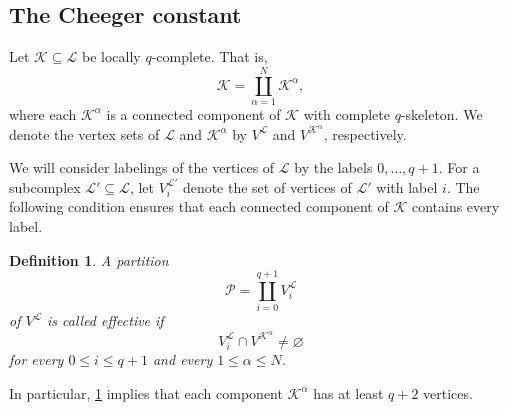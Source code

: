 \documentclass{article}
\newtheorem{definition}{Definition}[section]
\newcommand{\KK}{\mathcal{K}}
\newcommand{\LL}{\mathcal{L}}
\begin{document}
\subsection{The Cheeger constant}

Let $\KK \subseteq \LL$ be locally $q$-complete. That is,
\[
\KK = \coprod_{\alpha=1}^N \KK^\alpha,
\]
where each $\KK^\alpha$ is a connected component of $\KK$ with complete
$q$-skeleton. We denote the vertex sets of $\LL$ and $\KK^\alpha$ by
$V^\LL$ and $V^{\KK^\alpha}$, respectively.

We will consider labelings of the vertices of $\LL$ by the labels
$0,\ldots,q+1$. For a subcomplex $\LL'\subseteq \LL$, let
$V_i^{\LL'}$ denote the set of vertices of $\LL'$ with label $i$. The following condition ensures that each connected component of $\KK$
contains every label.

\begin{definition}\label{def:effective}
A partition
\[
\mathcal{P} = \coprod_{i=0}^{q+1} V_i^\LL
\]
of $V^\LL$ is called \emph{effective} if
\[
V_i^\LL \cap V^{\KK^\alpha} \neq \varnothing
\]
for every $0 \leq i \leq q+1$ and every $1 \leq \alpha \leq N$.
\end{definition}

In particular, \cref{def:effective} implies that each component
$\KK^\alpha$ has at least $q+2$ vertices.
\end{document}
